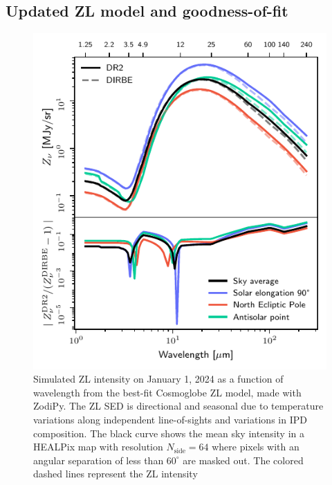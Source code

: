 \documentclass[twocolumn]{aa}
\begin{document}
\subsection{Updated ZL model and goodness-of-fit}

\begin{figure}
    \centering
    \includegraphics[width=\columnwidth]{figs/zodi_intensity.pdf}
    \caption{Simulated ZL intensity on January 1, 2024 as a function of wavelength from the best-fit 
    Cosmoglobe ZL model, made with ZodiPy. The ZL SED is directional 
    and seasonal due to temperature variations along independent line-of-sights and variations in IPD composition. 
    The black curve shows the mean sky intensity in a HEALPix map with resolution
    $N_\mathrm{side}= 64$ where pixels with an angular separation of less than
    $60^\circ$ are masked out. The colored dashed lines represent the ZL 
    intensity
    }
    \label{fig:zodi-intensity}
\end{figure}
\end{document}

